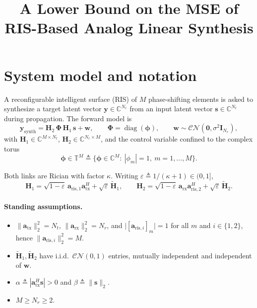 \documentclass[11pt]{article}
\title{A Lower Bound on the MSE of RIS-Based Analog Linear Synthesis}
\author{}
\date{}
\theoremstyle{remark}
\begin{document}
\maketitle


\section{System model and notation}

A reconfigurable intelligent surface (RIS) of $M$ phase-shifting elements is
asked to synthesize a target latent vector $\mathbf{y}\in\mathbb{C}^{N_r}$ from
an input latent vector $\mathbf{s}\in\mathbb{C}^{N_t}$ during propagation. The
forward model is
\begin{equation}
\mathbf{y}_{\mathrm{synth}}
= \mathbf{H}_2\,\boldsymbol{\Phi}\,\mathbf{H}_1\,\mathbf{s} + \mathbf{w},
\qquad
\boldsymbol{\Phi} = \operatorname{diag}(\boldsymbol{\phi}),
\qquad
\mathbf{w}\sim\mathcal{CN}(\mathbf{0},\sigma^2\mathbf{I}_{N_r}),
\label{eq:forward}
\end{equation}
with $\mathbf{H}_1\in\mathbb{C}^{M\times N_t}$,
$\mathbf{H}_2\in\mathbb{C}^{N_r\times M}$, and the control variable confined to
the complex torus
\begin{equation}
\boldsymbol{\phi}\in\mathbb{T}^{M} \triangleq
\bigl\{\boldsymbol{\phi}\in\mathbb{C}^{M}:\ |\phi_m|=1,\ m=1,\dots,M\bigr\}.
\label{eq:torus}
\end{equation}

Both links are Rician with factor $\kappa$. Writing
$\varepsilon\triangleq 1/(\kappa+1)\in(0,1]$,
\begin{equation}
\mathbf{H}_1=\sqrt{1-\varepsilon}\,\mathbf{a}_{\mathrm{ris},1}
             \mathbf{a}_{\mathrm{tx}}^{H}
            +\sqrt{\varepsilon}\,\tilde{\mathbf{H}}_1,
\qquad
\mathbf{H}_2=\sqrt{1-\varepsilon}\,\mathbf{a}_{\mathrm{rx}}
             \mathbf{a}_{\mathrm{ris},2}^{H}
            +\sqrt{\varepsilon}\,\tilde{\mathbf{H}}_2.
\label{eq:rician}
\end{equation}

\paragraph{Standing assumptions.}
\begin{itemize}
\item[(A1)] $\|\mathbf{a}_{\mathrm{tx}}\|_2^2=N_t$,
      $\|\mathbf{a}_{\mathrm{rx}}\|_2^2=N_r$, and
      $\bigl|[\mathbf{a}_{\mathrm{ris},i}]_m\bigr|=1$ for all $m$ and
      $i\in\{1,2\}$, hence $\|\mathbf{a}_{\mathrm{ris},i}\|_2^2=M$.
\item[(A2)] $\tilde{\mathbf{H}}_1,\tilde{\mathbf{H}}_2$ have i.i.d.\
      $\mathcal{CN}(0,1)$ entries, mutually independent and independent of
      $\mathbf{w}$.
\item[(A3)] $\alpha\triangleq|\mathbf{a}_{\mathrm{tx}}^{H}\mathbf{s}|>0$ and
      $\beta\triangleq\|\mathbf{s}\|_2$.
\item[(A4)] $M\ge N_r\ge 2$.
\end{itemize}
\end{document}
